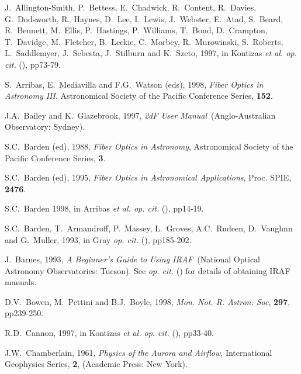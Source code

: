 \documentclass[chapters,twoside,11pt]{starlink}
\begin{document}
\newpage
{}
\begin{thebibliography}{99}

   J.~Allington-Smith, P.~Bettess, E.~Chadwick,
   R.~Content, R.~Davies, G.~Dodsworth, R.~Haynes, D.~Lee, I.~Lewis,
   J.~Webster, E.~Atad, S.~Beard, R.~Bennett, M.~Ellis, P.~Hastings,
   P.~Williams, T.~Bond, D.~Crampton, T.~Davidge, M.~Fletcher,
   B.~Leckie, C.~Morbey, R.~Murowinski, S.~Roberts, L.~Saddlemyer,
   J.~Sebesta, J.~Stilburn and K.~Szeto, 1997, in Kontizas \textit{et al.
   op. cit.}\/ (\cite{KONTIZAS97}), pp73-79.

   S.~Arribas, E.~Mediavilla and F.G.~Watson (eds),
   1998, \textit{Fiber Optics in Astronomy III}, Astronomical Society of
   the Pacific Conference Series, \textbf{152}.

   J.A.~Bailey and K.~Glazebrook, 1997, \textit{2dF
   User Manual}\, (Anglo-Australian Observatory: Sydney).

   S.C.~Barden (ed), 1988, \textit{Fiber Optics in
   Astronomy}, Astronomical Society of the Pacific Conference Series,
   \textbf{3}.

   S.C.~Barden (ed), 1995, \textit{Fiber Optics in
   Astronomical Applications}, Proc. SPIE, \textbf{2476}.

   S.C.~Barden 1998, in Arribas \textit{et al. op. cit.}\/
   (\cite{ARRIBAS98}), pp14-19.

   S.C.~Barden, T.~Armandroff, P.~Massey, L.~Groves,
   A.C.~Rudeen, D.~Vaughnn and G.~Muller, 1993, in Gray \textit{op. cit.}\/
   (\cite{GRAY93}), pp185-202.

   J.~Barnes, 1993, \textit{A Beginner's Guide to
   Using IRAF}\, (National Optical Astronomy Observatories: Tucson).
   See  \textit{op. cit.}\/ (\cite{SG12}) for details of
   obtaining IRAF manuals.

   D.V.~Bowen, M.~Pettini and B.J.~Boyle, 1998,
   \textit{Mon. Not. R. Astron. Soc}, \textbf{297}, pp239-250.

   R.D.~Cannon, 1997, in Kontizas \textit{et al.
   op. cit.}\/ (\cite{KONTIZAS97}), pp33-40.

   J.W.~Chamberlain, 1961, \textit{Physics of the
   Aurora and Airflow}, International Geophysics Series, \textbf{2},
   (Academic Press: New York).


\end{thebibliography}
\end{document}
